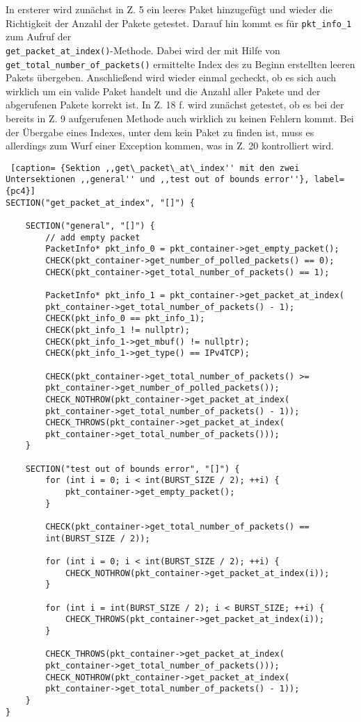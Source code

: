 \documentclass[../review_3.tex]{subfiles}
\begin{document}
In ersterer wird zunächst in Z. 5 ein leeres Paket hinzugefügt und wieder die Richtigkeit der Anzahl der Pakete getestet. Darauf hin kommt es für \texttt{pkt\_info\_1} zum Aufruf der\\ \texttt{get\_packet\_at\_index()}-Methode. Dabei wird der mit Hilfe von\\ \texttt{get\_total\_number\_of\_packets()} ermittelte Index des zu Beginn erstellten leeren Pakets übergeben. Anschließend wird wieder einmal gecheckt, ob es sich auch wirklich um ein valide Paket handelt und die Anzahl aller Pakete und der abgerufenen Pakete korrekt ist. In Z. 18 f. wird zunächst getestet, ob es bei der bereits in Z. 9 aufgerufenen Methode auch wirklich zu keinen Fehlern kommt. Bei der Übergabe eines Indexes, unter dem kein Paket zu finden ist, muss es allerdings zum Wurf einer Exception kommen, was in Z. 20 kontrolliert wird.

\begin{lstlisting} [caption= {Sektion ,,get\_packet\_at\_index'' mit den zwei Untersektionen ,,general'' und ,,test out of bounds error''}, label={pc4}]
SECTION("get_packet_at_index", "[]") {
    
    SECTION("general", "[]") {
        // add empty packet
        PacketInfo* pkt_info_0 = pkt_container->get_empty_packet();
        CHECK(pkt_container->get_number_of_polled_packets() == 0);
        CHECK(pkt_container->get_total_number_of_packets() == 1);
        
        PacketInfo* pkt_info_1 = pkt_container->get_packet_at_index(
        pkt_container->get_total_number_of_packets() - 1);
        CHECK(pkt_info_0 == pkt_info_1);
        CHECK(pkt_info_1 != nullptr);
        CHECK(pkt_info_1->get_mbuf() != nullptr);
        CHECK(pkt_info_1->get_type() == IPv4TCP);
        
        CHECK(pkt_container->get_total_number_of_packets() >=
        pkt_container->get_number_of_polled_packets());
        CHECK_NOTHROW(pkt_container->get_packet_at_index(
        pkt_container->get_total_number_of_packets() - 1));
        CHECK_THROWS(pkt_container->get_packet_at_index(
        pkt_container->get_total_number_of_packets()));
    }
    
    SECTION("test out of bounds error", "[]") {
        for (int i = 0; i < int(BURST_SIZE / 2); ++i) {
            pkt_container->get_empty_packet();
        }
        
        CHECK(pkt_container->get_total_number_of_packets() ==
        int(BURST_SIZE / 2));
        
        for (int i = 0; i < int(BURST_SIZE / 2); ++i) {
            CHECK_NOTHROW(pkt_container->get_packet_at_index(i));
        }
        
        for (int i = int(BURST_SIZE / 2); i < BURST_SIZE; ++i) {
            CHECK_THROWS(pkt_container->get_packet_at_index(i));
        }
        
        CHECK_THROWS(pkt_container->get_packet_at_index(
        pkt_container->get_total_number_of_packets()));
        CHECK_NOTHROW(pkt_container->get_packet_at_index(
        pkt_container->get_total_number_of_packets() - 1));
    } 
}\end{lstlisting}
\end{document}
